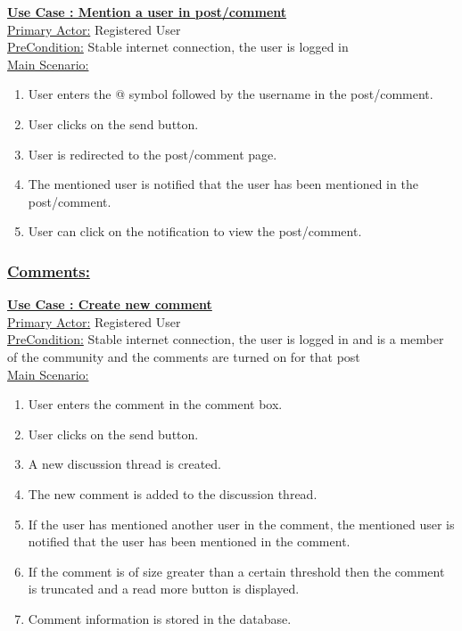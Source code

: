 \documentclass[conference,compsoc]{IEEEtran}
\newcounter{UC}
\newcommand{\nextU}{\stepcounter{UC}\theUC}
\begin{document}
\underline{\textbf{Use Case \nextU: Mention a user in post/comment}}\\

\underline{Primary Actor:} Registered User\\

\underline{PreCondition:} Stable internet connection, the user is logged in\\

\underline{Main Scenario:}\\

\begin{enumerate}
    \item User enters the @ symbol followed by the username in the post/comment.
    \item User clicks on the send button.
    \item User is redirected to the post/comment page.
    \item The mentioned user is notified that the user has been mentioned in the post/comment.
    \item User can click on the notification to view the post/comment.
\end{enumerate}

\subsubsection{\underline{Comments:}}

\underline{\textbf{Use Case \nextU: Create new comment}}\\

\underline{Primary Actor:} Registered User\\

\underline{PreCondition:} Stable internet connection, the user is logged in and is a member of the community and the comments are turned on for that post\\

\underline{Main Scenario:}\\
\begin{enumerate}
    \item User enters the comment in the comment box.
    \item User clicks on the send button.
    \item A new discussion thread is created.
    \item The new comment is added to the discussion thread.
    \item If the user has mentioned another user in the comment, the mentioned user is notified that the user has been mentioned in the comment.
    \item If the comment is of size greater than a certain threshold then the comment is truncated and a read more button is displayed.
    \item Comment information is stored in the database.
\end{enumerate}
\end{document}
